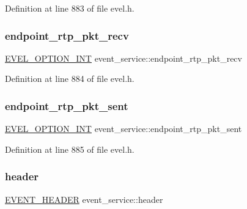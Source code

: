 Definition at line 883 of file evel.\+h.

\hypertarget{structevent__service_a160d6d987c16c2196e8b90c673a3909b}{}\label{structevent__service_a160d6d987c16c2196e8b90c673a3909b} 
\subsubsection{\texorpdfstring{endpoint\+\_\+rtp\+\_\+pkt\+\_\+recv}{endpoint\_rtp\_pkt\_recv}}
{\footnotesize\ttfamily \hyperlink{evel_8h_a452d825778d1c2368a54b8f689a25ba7}{E\+V\+E\+L\+\_\+\+O\+P\+T\+I\+O\+N\+\_\+\+I\+NT} event\+\_\+service\+::endpoint\+\_\+rtp\+\_\+pkt\+\_\+recv}



Definition at line 884 of file evel.\+h.

\hypertarget{structevent__service_addec20dbe742e8268bb6693ad180fd60}{}\label{structevent__service_addec20dbe742e8268bb6693ad180fd60} 
\subsubsection{\texorpdfstring{endpoint\+\_\+rtp\+\_\+pkt\+\_\+sent}{endpoint\_rtp\_pkt\_sent}}
{\footnotesize\ttfamily \hyperlink{evel_8h_a452d825778d1c2368a54b8f689a25ba7}{E\+V\+E\+L\+\_\+\+O\+P\+T\+I\+O\+N\+\_\+\+I\+NT} event\+\_\+service\+::endpoint\+\_\+rtp\+\_\+pkt\+\_\+sent}



Definition at line 885 of file evel.\+h.

\hypertarget{structevent__service_a3706063c56d2ed4ba03d6cb807dc384f}{}\label{structevent__service_a3706063c56d2ed4ba03d6cb807dc384f} 
\subsubsection{\texorpdfstring{header}{header}}
{\footnotesize\ttfamily \hyperlink{evel_8h_aa0ea94c675729365ea7825c4fc7e06d8}{E\+V\+E\+N\+T\+\_\+\+H\+E\+A\+D\+ER} event\+\_\+service\+::header}



